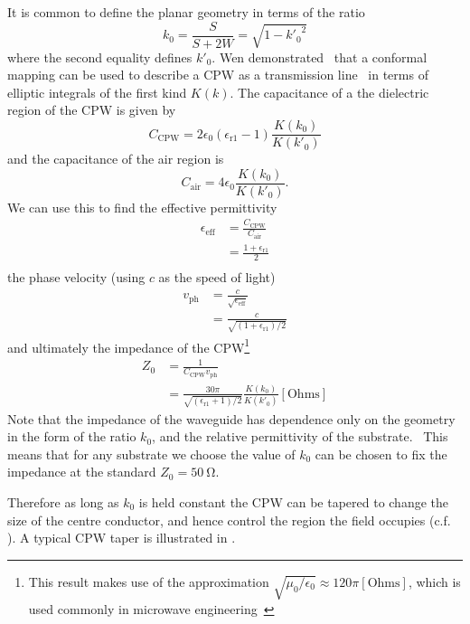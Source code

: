 It is common to define the planar geometry in terms of the
ratio~\cite{1127105, Simons2004}
\begin{equation}
  k_0 = \frac{S}{S+2W} = \sqrt{1-{k'_0}^2}
  \label{eqn:k0def}
\end{equation}
where the second equality defines $k'_0$.
%
Wen demonstrated~\cite{1127105} that a conformal mapping can be used to describe
a CPW as a transmission line~\cite{Jackson1975} in terms of elliptic integrals
of the first kind $K(k)$. The capacitance of a the dielectric region of the CPW
is given by
\begin{equation}
  C_\mathrm{CPW} = 2\epsilon_0(\epsilon_\mathrm{r1}-1)\frac{K(k_0)}{K(k'_0)}
\end{equation}
and the capacitance of the air region is
\begin{equation}
  C_\mathrm{air} = 4\epsilon_0 \frac{K(k_0)}{K(k'_0)}.
\end{equation}
We can use this to find the effective permittivity 
\begin{align}
  \epsilon_\mathrm{eff} &= \frac{C_\mathrm{CPW}}{C_\mathrm{air}} \\
    &= \frac{1+ \epsilon_\mathrm{r1}}{2} \\
\end{align}
the phase velocity (using $c$ as the speed of light)
\begin{align}
  v_\mathrm{ph} &= \frac{c}{\sqrt{\epsilon_\mathrm{eff}}} \\
    &= \frac{c}{\sqrt{(1 + \epsilon_\mathrm{r1})/2}}
\end{align}
and ultimately the impedance of the CPW\footnote{This result makes use of the
approximation $\sqrt{\mu_0/\epsilon_0}\approx120\pi\mathrm{[Ohms]}$, which is
used commonly in microwave engineering~}
\begin{align}
  Z_0 &= \frac{1}{C_\mathrm{CPW} v_\mathrm{ph}} \\
    &= \frac{30 \pi}{\sqrt{(\epsilon_\mathrm{r1}+1)/2}} \frac{K(k_0)}{K(k'_0)}
    \mathrm{[Ohms]}
\end{align}
Note that the impedance of the waveguide has dependence only on the geometry in
the form of the ratio $k_0$, and the relative permittivity of the
substrate.~\cite{Simons2004} This means that for any substrate we choose the
value of $k_0$ can be chosen to fix the impedance at the standard $Z_0 =
\SI{50}{\ohm}$.

Therefore as long as $k_0$ is held constant the CPW can be tapered to change the
size of the centre conductor, and hence control the region the field occupies
(c.f. ).  A typical CPW taper is illustrated
in .~


